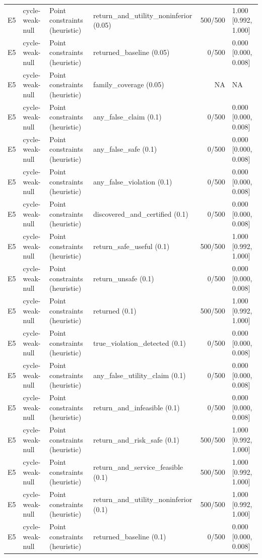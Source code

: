 \begin{longtable}{p{.04\linewidth}p{.18\linewidth}p{.19\linewidth}p{.16\linewidth}r p{.21\linewidth}}
E5 & cycle-weak-null & Point constraints (heuristic) & return\_and\_utility\_noninferior (0.05) & 500/500 & 1.000 [0.992, 1.000]\\
E5 & cycle-weak-null & Point constraints (heuristic) & returned\_baseline (0.05) & 0/500 & 0.000 [0.000, 0.008]\\
E5 & cycle-weak-null & Point constraints (heuristic) & family\_coverage (0.05) & NA & NA\\
E5 & cycle-weak-null & Point constraints (heuristic) & any\_false\_claim (0.1) & 0/500 & 0.000 [0.000, 0.008]\\
E5 & cycle-weak-null & Point constraints (heuristic) & any\_false\_safe (0.1) & 0/500 & 0.000 [0.000, 0.008]\\
E5 & cycle-weak-null & Point constraints (heuristic) & any\_false\_violation (0.1) & 0/500 & 0.000 [0.000, 0.008]\\
E5 & cycle-weak-null & Point constraints (heuristic) & discovered\_and\_certified (0.1) & 0/500 & 0.000 [0.000, 0.008]\\
E5 & cycle-weak-null & Point constraints (heuristic) & return\_safe\_useful (0.1) & 500/500 & 1.000 [0.992, 1.000]\\
E5 & cycle-weak-null & Point constraints (heuristic) & return\_unsafe (0.1) & 0/500 & 0.000 [0.000, 0.008]\\
E5 & cycle-weak-null & Point constraints (heuristic) & returned (0.1) & 500/500 & 1.000 [0.992, 1.000]\\
E5 & cycle-weak-null & Point constraints (heuristic) & true\_violation\_detected (0.1) & 0/500 & 0.000 [0.000, 0.008]\\
E5 & cycle-weak-null & Point constraints (heuristic) & any\_false\_utility\_claim (0.1) & 0/500 & 0.000 [0.000, 0.008]\\
E5 & cycle-weak-null & Point constraints (heuristic) & return\_and\_infeasible (0.1) & 0/500 & 0.000 [0.000, 0.008]\\
E5 & cycle-weak-null & Point constraints (heuristic) & return\_and\_risk\_safe (0.1) & 500/500 & 1.000 [0.992, 1.000]\\
E5 & cycle-weak-null & Point constraints (heuristic) & return\_and\_service\_feasible (0.1) & 500/500 & 1.000 [0.992, 1.000]\\
E5 & cycle-weak-null & Point constraints (heuristic) & return\_and\_utility\_noninferior (0.1) & 500/500 & 1.000 [0.992, 1.000]\\
E5 & cycle-weak-null & Point constraints (heuristic) & returned\_baseline (0.1) & 0/500 & 0.000 [0.000, 0.008]\\

\end{longtable}
